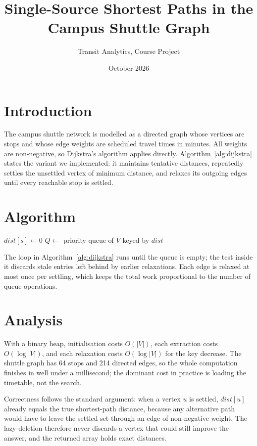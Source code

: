 \documentclass[11pt]{article}
\title{Single-Source Shortest Paths in the Campus Shuttle Graph}
\author{Transit Analytics, Course Project}
\date{October 2026}
\begin{document}
\maketitle

\section{Introduction}
The campus shuttle network is modelled as a directed graph whose
vertices are stops and whose edge weights are scheduled travel times
in minutes. All weights are non-negative, so Dijkstra's algorithm
applies directly. Algorithm~\ref{alg:dijkstra} states the variant we
implemented: it maintains tentative distances, repeatedly settles the
unsettled vertex of minimum distance, and relaxes its outgoing edges
until every reachable stop is settled.

\section{Algorithm}
\begin{algorithm}[htbp]
\SetAlgoLined
{}
$\mathit{dist}[s] \gets 0$\;
$Q \gets$ priority queue of $V$ keyed by $\mathit{dist}$\;
\;
\caption{Dijkstra's algorithm with lazy deletion.}
\label{alg:dijkstra}
\end{algorithm}

The \While loop in Algorithm~\ref{alg:dijkstra} runs until the queue
is empty; the \If test inside it discards stale entries left behind
by earlier relaxations. Each edge is relaxed at most once per
settling, which keeps the total work proportional to the number of
queue operations.

\section{Analysis}
With a binary heap, initialisation costs $O(|V|)$, each extraction
costs $O(\log |V|)$, and each relaxation costs $O(\log |V|)$ for the
key decrease. The shuttle graph has 64 stops and 214 directed edges,
so the whole computation finishes in well under a millisecond; the
dominant cost in practice is loading the timetable, not the search.

Correctness follows the standard argument: when a vertex $u$ is
settled, $\mathit{dist}[u]$ already equals the true shortest-path
distance, because any alternative path would have to leave the
settled set through an edge of non-negative weight. The lazy-deletion
\If therefore never discards a vertex that could still improve the
answer, and the returned array holds exact distances.
\end{document}
